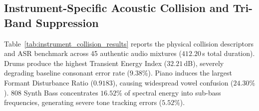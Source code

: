 \begin{table}[t]
\centering
\caption{Edge hardware post-training INT8 quantization telemetry across all four proposed acoustic adapter modules.}
\label{tab:edge_quantization}
\end{table}

\subsection{Instrument-Specific Acoustic Collision and Tri-Band Suppression}
Table~\ref{tab:instrument_collision_results} reports the physical collision descriptors and ASR benchmark across 45 authentic audio mixtures ($412.20$\,s total duration). Drums produce the highest Transient Energy Index ($32.21$\,dB), severely degrading baseline consonant error rate ($9.38\%$). Piano induces the largest Formant Disturbance Ratio ($0.9183$), causing widespread vowel confusion ($24.30\%$). 808 Synth Bass concentrates $16.52\%$ of spectral energy into sub-bass frequencies, generating severe tone tracking errors ($5.52\%$).


